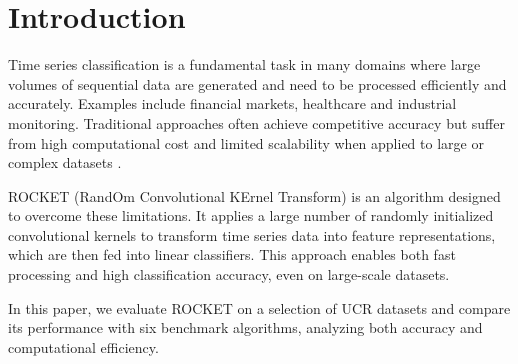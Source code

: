 \section{Introduction}
Time series classification is a fundamental task in many domains where large volumes of sequential data are generated and need to be processed efficiently and accurately. Examples include financial markets, healthcare and industrial monitoring. Traditional approaches often achieve competitive accuracy but suffer from high computational cost and limited scalability when applied to large or complex datasets \cite{bagnall2017bakeoff,middlehurst2024bakeoffredux}.

ROCKET (RandOm Convolutional KErnel Transform) is an algorithm designed to overcome these limitations. It applies a large number of randomly initialized convolutional kernels to transform time series data into feature representations, which are then fed into linear classifiers. This approach enables both fast processing and high classification accuracy, even on large-scale datasets.

In this paper, we evaluate ROCKET on a selection of UCR datasets \cite{ucr} and compare its performance with six benchmark algorithms, analyzing both accuracy and computational efficiency.
